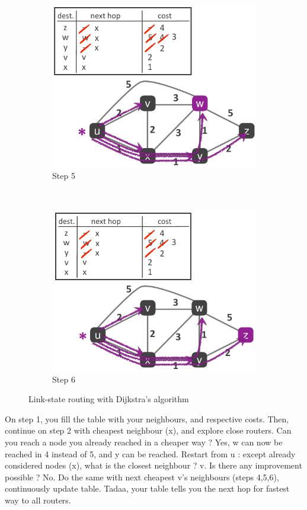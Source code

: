 \documentclass[12pt,a4paper]{article}
\begin{document}
\begin{figure}[h]
\begin{subfigure}[b]{0.3\textwidth}
		\centering
		\includegraphics[scale=0.4]{images/dijkstra5}
		\caption{Step 5}
		\label{subf: step5}
	\end{subfigure}
	~
	\begin{subfigure}[b]{0.3\textwidth}
		\centering
		\includegraphics[scale=0.4]{images/dijkstra6}
		\caption{Step 6}
		\label{subf: step6}
	\end{subfigure}
	\caption{Link-state routing with Dijkstra's algorithm}
	\label{fig: example link state routing}
\end{figure}

On step 1, you fill the table with your neighbours, and respective costs. Then, continue on step 2 with cheapest neighbour (x), and explore close routers. Can you reach a node you already reached in a cheaper way ? Yes, w can now be reached in 4 instead of 5, and y can be reached. Restart from u : except already considered nodes (x), what is the closest neighbour ? v. Is there any improvement possible ? No. Do the same with next cheapest v's neighbours (steps 4,5,6), continuously update table. Tadaa, your table tells you the next hop for fastest way to all routers.
\end{document}
